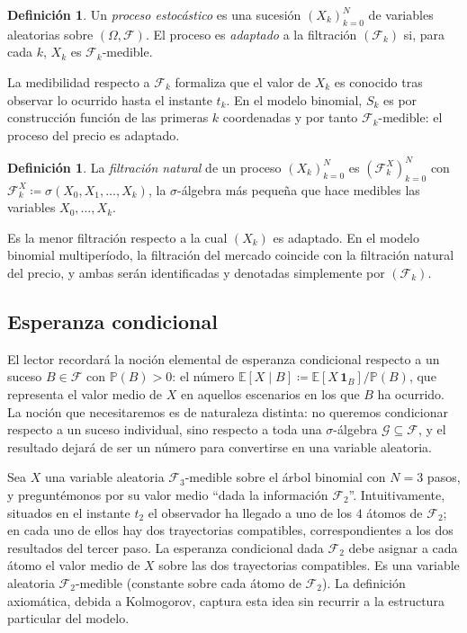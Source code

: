 \documentclass[11pt,a4paper,oneside]{report}
\theoremstyle{plain}
\theoremstyle{definition}
\newtheorem{definicion}[teorema]{Definición}
\theoremstyle{remark}
\newcommand{\E}{\mathbb{E}}
\newcommand{\PP}{\mathbb{P}}
\newcommand{\F}{\mathcal{F}}
\newcommand{\G}{\mathcal{G}}
\newcommand{\1}{\mathbf{1}}
\newcommand{\eqdef}{\coloneqq}
\begin{document}
\medskip

\begin{definicion}
\label{def:adaptado}
Un \emph{proceso estocástico} es una sucesión $(X_k)_{k=0}^{N}$ de
variables aleatorias sobre $(\Omega, \F)$. El proceso es
\emph{adaptado} a la filtración $(\F_k)$ si, para cada $k$, $X_k$ es
$\F_k$-medible.
\end{definicion}

La medibilidad respecto a $\F_k$ formaliza que el valor de $X_k$ es
conocido tras observar lo ocurrido hasta el instante $t_k$. En el
modelo binomial, $S_k$ es por construcción función de las primeras $k$
coordenadas y por tanto $\F_k$-medible: el proceso del precio es
adaptado.

\medskip

\begin{definicion}
\label{def:filtracion_natural}
La \emph{filtración natural} de un proceso $(X_k)_{k=0}^{N}$ es
$(\F_k^X)_{k=0}^{N}$ con $\F_k^X \eqdef \sigma(X_0, X_1, \ldots, X_k)$,
la $\sigma$-álgebra más pequeña que hace medibles las variables $X_0,
\ldots, X_k$.
\end{definicion}

Es la menor filtración respecto a la cual $(X_k)$ es adaptado. En el
modelo binomial multiperíodo, la filtración del mercado coincide con la
filtración natural del precio, y ambas serán identificadas y denotadas
simplemente por $(\F_k)$.

\subsection{Esperanza condicional}
\label{subsec:esperanza_condicional}

El lector recordará la noción
elemental de esperanza condicional respecto a un suceso $B \in \F$ con
$\PP(B) > 0$: el número $\E[X \mid B] \eqdef \E[X\, \1_B]/\PP(B)$, que
representa el valor medio de $X$ en aquellos escenarios en los que $B$
ha ocurrido. La noción que necesitaremos es de naturaleza distinta: no
queremos condicionar respecto a un suceso individual, sino respecto a
toda una $\sigma$-álgebra $\G \subseteq \F$, y el resultado dejará de
ser un número para convertirse en una variable aleatoria.

Sea $X$ una variable
aleatoria $\F_3$-medible sobre el árbol binomial con $N = 3$ pasos, y
preguntémonos por su valor medio ``dada la información $\F_2$''.
Intuitivamente, situados en el instante $t_2$ el observador ha llegado
a uno de los $4$ átomos de $\F_2$; en cada uno de ellos hay dos
trayectorias compatibles, correspondientes a los dos resultados del
tercer paso. La esperanza condicional dada $\F_2$ debe asignar a cada
átomo el valor medio de $X$ sobre las dos trayectorias compatibles. Es
una variable aleatoria $\F_2$-medible (constante sobre cada átomo de
$\F_2$). La definición axiomática, debida a Kolmogorov, captura esta idea sin recurrir a la
estructura particular del modelo.
\end{document}

